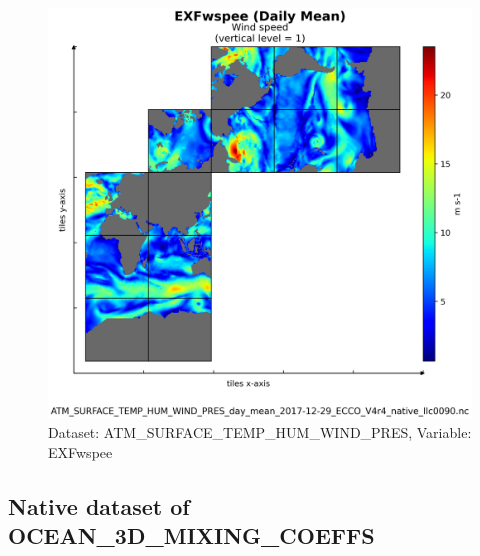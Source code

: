 \begin{figure}[H]
\centering
\includegraphics[scale=0.55]{../images/plots/v4r4/native_plots/Atmosphere_Surface_Temperature_Humidity_Wind_and_Pressure/EXFwspee.png}
\caption{Dataset: ATM\_SURFACE\_TEMP\_HUM\_WIND\_PRES, Variable: EXFwspee}
\label{tab:table-ATM_SURFACE_TEMP_HUM_WIND_PRES_EXFwspee-Plot}
\end{figure}
\newpage
\subsection{Native dataset of OCEAN\_3D\_MIXING\_COEFFS}
\newp
